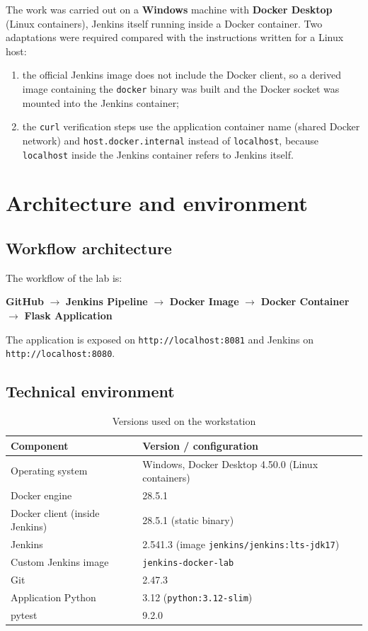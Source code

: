 \documentclass[11pt,a4paper]{article}
\begin{document}
The work was carried out on a \textbf{Windows} machine with \textbf{Docker Desktop}
(Linux containers), Jenkins itself running inside a Docker container.
Two adaptations were required compared with the instructions written for a Linux host:
\begin{enumerate}[leftmargin=1.2cm]
  \item the official Jenkins image does not include the Docker client, so a derived image
        containing the \texttt{docker} binary was built and the Docker socket was mounted
        into the Jenkins container;
  \item the \texttt{curl} verification steps use the application container name (shared
        Docker network) and \texttt{host.docker.internal} instead of \texttt{localhost},
        because \texttt{localhost} inside the Jenkins container refers to Jenkins itself.
\end{enumerate}

\section{Architecture and environment}

\subsection{Workflow architecture}

The workflow of the lab is:
\begin{center}
\textbf{GitHub} $\rightarrow$ \textbf{Jenkins Pipeline} $\rightarrow$
\textbf{Docker Image} $\rightarrow$ \textbf{Docker Container} $\rightarrow$
\textbf{Flask Application}
\end{center}

The application is exposed on \texttt{http://localhost:8081} and Jenkins on
\texttt{http://localhost:8080}.

\subsection{Technical environment}

\begin{table}[h!]
\centering
\caption{Versions used on the workstation}
\begin{tabular}{@{}ll@{}}
\toprule
Component & Version / configuration \\
\midrule
Operating system & Windows, Docker Desktop 4.50.0 (Linux containers) \\
Docker engine & 28.5.1 \\
Docker client (inside Jenkins) & 28.5.1 (static binary) \\
Jenkins & 2.541.3 (image \texttt{jenkins/jenkins:lts-jdk17}) \\
Custom Jenkins image & \texttt{jenkins-docker-lab} \\
Git & 2.47.3 \\
Application Python & 3.12 (\texttt{python:3.12-slim}) \\
pytest & 9.2.0 \\
\bottomrule
\end{tabular}
\end{table}
\end{document}
